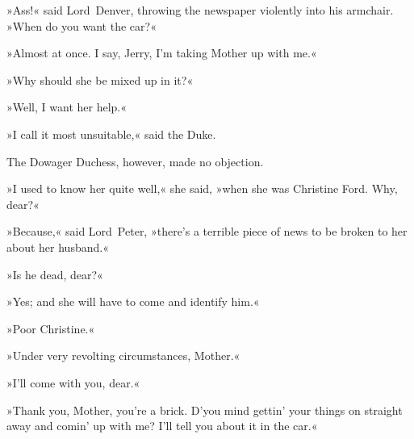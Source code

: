 »Ass!« said Lord~Denver, throwing the newspaper violently into his armchair. »When do you want the car?«

»Almost at once. I say, Jerry, I'm taking Mother up with me.«

»Why should she be mixed up in it?«

»Well, I want her help.«

»I call it most unsuitable,« said the Duke.

The Dowager Duchess, however, made no objection.

»I used to know her quite well,« she said, »when she was Christine Ford. Why, dear?«

»Because,« said Lord~Peter, »there's a terrible piece of news to be broken to her about her husband.«

»Is he dead, dear?«

»Yes; and she will have to come and identify him.«

»Poor Christine.«

»Under very revolting circumstances, Mother.«

»I'll come with you, dear.«

»Thank you, Mother, you're a brick. D'you mind gettin' your things on straight away and comin' up with me? I'll tell you about it in the car.«